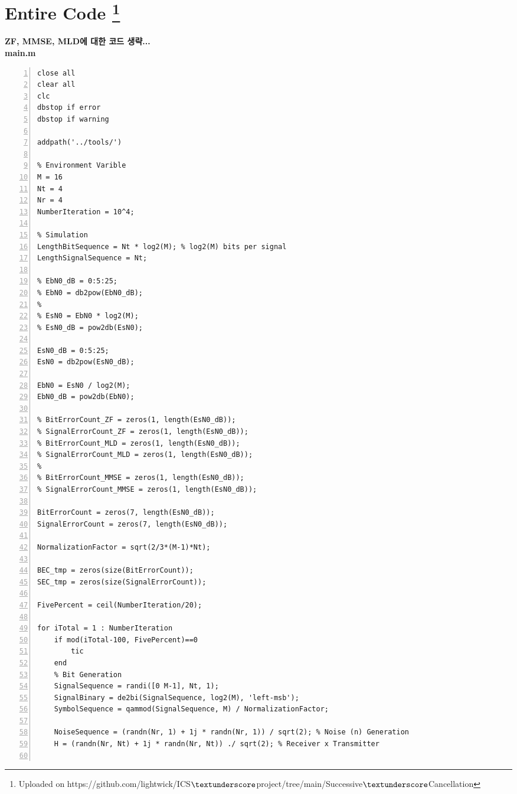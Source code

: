 \documentclass{article}
\newcommand{\bd}{\textbf} %
\begin{document}
\section[Entire Code]{Entire Code \footnote{Uploaded on https://github.com/lightwick/ICS$\textunderscore $project/tree/main/Successive$\textunderscore $Cancellation}}
\bd{ZF, MMSE, MLD에 대한 코드 생략...}\\
\noindent\bd{main.m}
\begin{lstlisting}[style=Matlab-editor, frame=single, numbers=left,]
close all
clear all
clc
dbstop if error
dbstop if warning

addpath('../tools/')

% Environment Varible
M = 16
Nt = 4
Nr = 4
NumberIteration = 10^4;

% Simulation
LengthBitSequence = Nt * log2(M); % log2(M) bits per signal
LengthSignalSequence = Nt;

% EbN0_dB = 0:5:25;
% EbN0 = db2pow(EbN0_dB);
% 
% EsN0 = EbN0 * log2(M);
% EsN0_dB = pow2db(EsN0);

EsN0_dB = 0:5:25;
EsN0 = db2pow(EsN0_dB);

EbN0 = EsN0 / log2(M);
EbN0_dB = pow2db(EbN0);

% BitErrorCount_ZF = zeros(1, length(EsN0_dB));
% SignalErrorCount_ZF = zeros(1, length(EsN0_dB));
% BitErrorCount_MLD = zeros(1, length(EsN0_dB));
% SignalErrorCount_MLD = zeros(1, length(EsN0_dB));
% 
% BitErrorCount_MMSE = zeros(1, length(EsN0_dB));
% SignalErrorCount_MMSE = zeros(1, length(EsN0_dB));

BitErrorCount = zeros(7, length(EsN0_dB));
SignalErrorCount = zeros(7, length(EsN0_dB));

NormalizationFactor = sqrt(2/3*(M-1)*Nt);

BEC_tmp = zeros(size(BitErrorCount));
SEC_tmp = zeros(size(SignalErrorCount));
    
FivePercent = ceil(NumberIteration/20);
    
for iTotal = 1 : NumberIteration
    if mod(iTotal-100, FivePercent)==0
        tic
    end
    % Bit Generation
    SignalSequence = randi([0 M-1], Nt, 1);
    SignalBinary = de2bi(SignalSequence, log2(M), 'left-msb');
    SymbolSequence = qammod(SignalSequence, M) / NormalizationFactor;
    
    NoiseSequence = (randn(Nr, 1) + 1j * randn(Nr, 1)) / sqrt(2); % Noise (n) Generation
    H = (randn(Nr, Nt) + 1j * randn(Nr, Nt)) ./ sqrt(2); % Receiver x Transmitter


\end{lstlisting}
\end{document}
